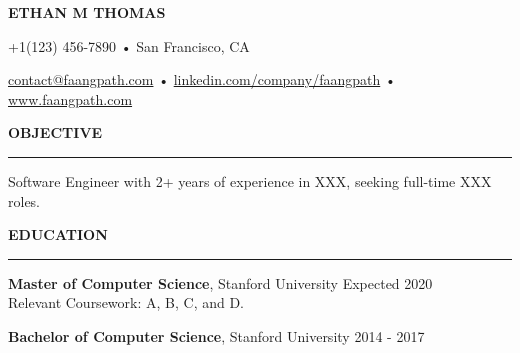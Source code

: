 \documentclass[11pt,letterpaper]{article}
\begin{document}
\begingroup
    \centerline{\MakeUppercase{\LARGE\bf Ethan M Thomas}}
    \medskip
\endgroup

\begingroup
\centerline{+1(123) 456-7890 • San Francisco, CA}
\endgroup
\par

\begingroup
\centerline{\href{mailto:contact@faangpath.com}{contact@faangpath.com} • \href{https://linkedin.com/company/faangpath}{linkedin.com/company/faangpath} • \href{www.faangpath.com}{www.faangpath.com}}
\endgroup
\par


\medskip
\MakeUppercase{{\bf Objective}} %
\medskip
\hrule %
\begin{list}{}{\setlength{\leftmargin}{0em}}
\item 
    {Software Engineer with 2+ years of experience in XXX, seeking full-time XXX roles.}
\end{list}


\medskip
\MakeUppercase{{\bf Education}} %
\medskip
\hrule %
\begin{list}{}{\setlength{\leftmargin}{0em}}
\item 
{\bf Master of Computer Science}, Stanford University \hfill {Expected 2020}\\
Relevant Coursework: A, B, C, and D.
\item 
{\bf Bachelor of Computer Science}, Stanford University \hfill {2014 - 2017}
\end{list}


\end{document}
